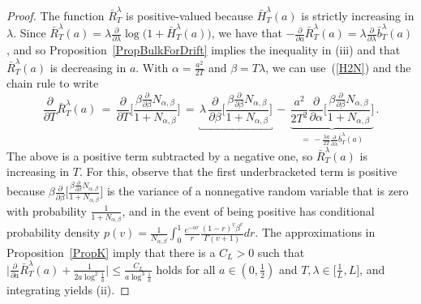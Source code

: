 \documentclass[10pt]{article}
\numberwithin{equation}{section}
\theoremstyle{definition}
\begin{document}
\begin{proof} The function $\bar{R}^{\lambda}_T$ is positive-valued because $\bar{H}_{T}^{\lambda}( a)$ is strictly increasing in $\lambda$. Since 
$ \bar{R}^{\lambda}_T(a)= \lambda \frac{\partial}{\partial \lambda}\log\big( 1+  \bar{H}_{T}^{\lambda}( a)\big)$,  we have that $-\frac{\partial}{\partial a}  \bar{R}^{\lambda}_T(a)= \lambda \frac{\partial}{\partial \lambda}\bar{b}^{\lambda}_T(a)$, and so Proposition~\ref{PropBulkForDrift}  implies the   inequality in (iii) and that $\bar{R}^{\lambda}_T(a)$ is decreasing in $a$.  With $\alpha= \frac{a^2}{2T} $ and $\beta=T\lambda$, we can use~(\ref{H2N}) and the chain rule to write 
$$ \frac{ \partial }{\partial T  }\bar{R}^{\lambda}_T(a) \,=\, \frac{ \partial }{\partial T  }\bigg[ \frac{ \beta \frac{\partial}{\partial \beta}N_{\alpha,\beta} }{1+N_{\alpha,\beta} }\bigg] \,=\, \underbracket{\lambda\,\frac{\partial}{\partial \beta}\bigg[ \frac{ \beta \frac{\partial}{\partial \beta}N_{\alpha,\beta}  }{1+N_{\alpha,\beta} }\bigg]}\,-\,\underbrace{\frac{ a^2 }{2 T^2 }  \frac{ \partial }{\partial \alpha}\bigg[  \frac{\beta \frac{\partial}{\partial \beta}N_{\alpha,\beta}  }{1+N_{\alpha,\beta} } \bigg]}_{ =\,-\frac{\lambda a}{2T} \frac{\partial}{\partial \lambda}\bar{b}^{\lambda}_T(a) }\,. $$
The above is a positive  term subtracted by a negative one, so $\bar{R}^{\lambda}_T(a)$ is increasing in $T$.  For this, observe that the first underbracketed term is positive because $\beta\frac{\partial}{\partial \beta}\big[ \frac{ \beta \frac{\partial}{\partial \beta}N_{\alpha,\beta}  }{1+N_{\alpha,\beta} }\big]$ is the variance of a nonnegative random variable that is zero with probability $\frac{1}{ 1+N_{\alpha,\beta} }$, and in the event of being positive has conditional probability density $p(v)=\frac{1}{N_{\alpha,\beta} }\int_0^1\frac{ e^{-\alpha r} }{r}\frac{ (1-r)^v\beta^v
 }{ \Gamma(v+1) }dr  $. The approximations in  Proposition~\ref{PropK} imply that there is a $C_L>0$ such that  $\big|\frac{\partial}{\partial a} \bar{R}_{T}^{\lambda}(a) +\frac{1}{2a\log^2\frac{1}{a} }\big|\leq  \frac{C_L}{a\log^3 \frac{1}{a} }   $ holds for all $a\in (0,\frac{1}{2})$ and  $T,\lambda\in \big[\frac{1}{L},  L\big]$, and integrating yields (ii). \end{proof}
\end{document}
